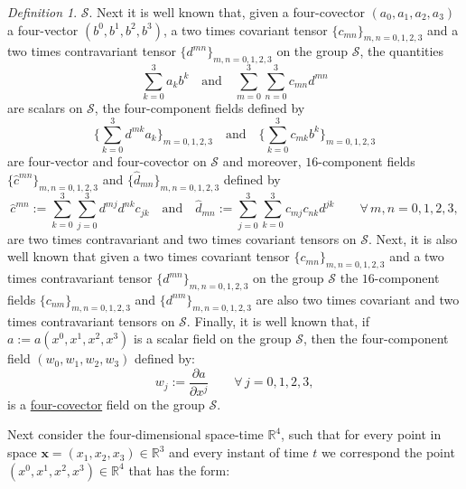 \documentclass{article}
\theoremstyle{definition}
\newtheorem{definition}{Definition}[section]
\theoremstyle{remark}
\renewcommand{\vec}[1]{\mathbf{#1}}
\newtheorem{definition}{Definition}
\begin{document}
\begin{definition}
$\mathcal{S}$. Next it is well known that, given a four-covector
$(a_0,a_1,a_2,a_3)$ a four-vector $(b^0,b^1,b^2,b^3)$, a two times
covariant tensor $\{c_{mn}\}_{m,n=0,1,2,3}$ and a two times
contravariant tensor $\{d^{mn}\}_{m,n=0,1,2,3}$ on the group
$\mathcal{S}$, the quantities
\begin{equation}\label{fgjfjhgghhgjghjhjkkkkgjghghuiiiukljk}
\sum_{k=0}^{3}a_kb^k\quad\text{and}\quad
\sum_{m=0}^{3}\sum_{n=0}^{3}c_{mn}d^{mn}
\end{equation}
are scalars on $\mathcal{S}$, the four-component fields defined by
\begin{equation}\label{fgjfjhgghhgjghjhjkkkkgjghghuiiiulkkj}
\Big\{\sum_{k=0}^{3}d^{mk}a_{k}\Big\}_{m=0,1,2,3}\quad\text{and}\quad
\Big\{\sum_{k=0}^{3}c_{mk}b^{k}\Big\}_{m=0,1,2,3}
\end{equation}
are four-vector and four-covector on $\mathcal{S}$ and moreover,
$16$-component fields $\{\hat c^{mn}\}_{m,n=0,1,2,3}$ and $\{\hat
d_{mn}\}_{m,n=0,1,2,3}$ defined by
\begin{equation}\label{fgjfjhgghhgjghjhjkkkkgjghghuiiiulkkjlkkl}
\hat
c^{mn}:=\sum_{k=0}^{3}\sum_{j=0}^{3}d^{mj}d^{nk}c_{jk}\quad\text{and}\quad
\hat
d_{mn}:=\sum_{j=0}^{3}\sum_{k=0}^{3}c_{mj}c_{nk}d^{jk}\quad\quad\forall\,
m,n=0,1,2,3,
\end{equation}
are two times contravariant and two times covariant tensors on
$\mathcal{S}$. Next, it is also well known that given a two times
covariant tensor $\{c_{mn}\}_{m,n=0,1,2,3}$ and a two times
contravariant tensor $\{d^{mn}\}_{m,n=0,1,2,3}$ on the group
$\mathcal{S}$ the $16$-component fields $\{c_{nm}\}_{m,n=0,1,2,3}$
and $\{d^{nm}\}_{m,n=0,1,2,3}$ are also two times covariant and two
times contravariant tensors on $\mathcal{S}$. Finally, it is well
known that, if $a:=a(x^0,x^1,x^2,x^3)$ is a scalar field on the
group $\mathcal{S}$, then the four-component field
$(w_0,w_1,w_2,w_3)$ defined by:
\begin{equation}\label{fgjfjhgghhgjghjhjkkkkgjghghuiiiulkkjlkklplikkl}
w_j:=\frac{\partial a}{\partial x^j}\quad\quad\forall\,j=0,1,2,3,
\end{equation}
is a \underline{four-covector} field on the group $\mathcal{S}$.
\end{definition}
Next consider the four-dimensional space-time $\mathbb{R}^4$, such
that for every point in space $\vec x=(x_1,x_2,x_3)\in\mathbb{R}^3$
and every instant of time $t$ we correspond the point
$(x^0,x^1,x^2,x^3)\in\mathbb{R}^4$ that has the form:
\end{document}
